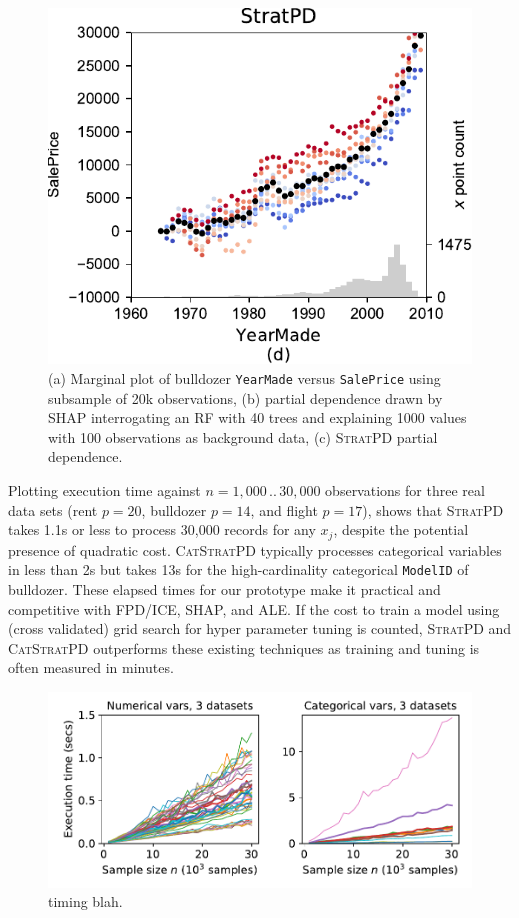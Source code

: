 \documentclass{article}
\newcommand{\spd}{\fontfamily{cmr}\textsc{\small StratPD}}
\newcommand{\cspd}{\fontfamily{cmr}\textsc{\small CatStratPD}}
\begin{document}
\begin{figure}[htbp]
\begin{center}
\includegraphics[scale=0.35]{images/bulldozer_YearMade_stratpd.pdf}
\caption{\small (a) Marginal plot of bulldozer {\tt YearMade} versus {\tt SalePrice} using subsample of 20k observations, (b) partial dependence drawn by SHAP interrogating an RF with 40 trees and explaining 1000 values with 100 observations as background data, (c) \spd{} partial dependence.}
\label{fig:yearmade}
\end{center}
\end{figure}


Plotting execution time against $n=1,000\, ..\, 30,000$ observations for three real data sets (rent $p=20$, bulldozer $p=14$, and flight $p=17$), shows that \spd{} takes 1.1s or less to process 30,000 records for any $x_j$, despite the potential presence of quadratic cost. \cspd{} typically processes categorical variables in less than 2s but takes 13s for the high-cardinality categorical {\tt\small ModelID} of bulldozer.  These elapsed times for our prototype make it practical and  competitive with FPD/ICE, SHAP, and ALE.   If the cost to train a model using (cross validated) grid search for hyper parameter tuning is counted, \spd{} and \cspd{} outperforms these existing techniques as training and tuning is often measured in minutes. 

\begin{figure}[htbp]
\begin{center}
\includegraphics[scale=.4]{images/timing.pdf}
\caption{\small timing blah.}
\label{fig:timing}
\end{center}
\end{figure}
\end{document}
